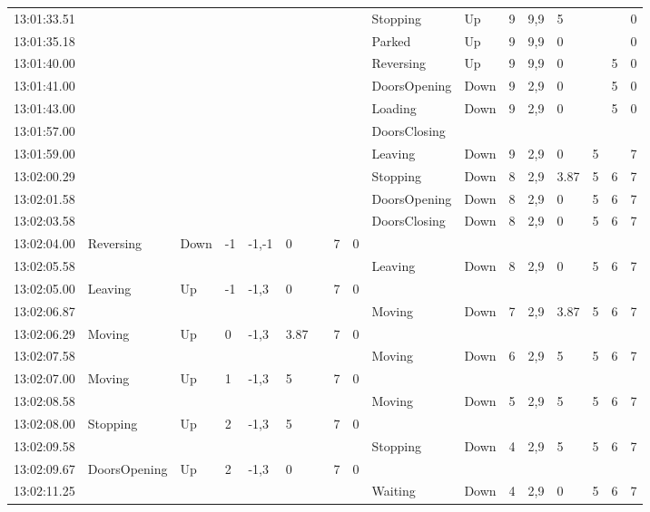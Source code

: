 \documentclass{UoYCSproject}
\begin{document}
\begin{landscape}
\begin{longtable}{l || l | l | l | l | l | l | l | l || l | l | l | l | l | l | l | l}
	13:01:33.51 &  &  &  &  &  &  &  &  & Stopping & Up & 9 & 9,9 & 5 &  &  & 0 \\
	13:01:35.18 &  &  &  &  &  &  &  &  & Parked & Up & 9 & 9,9 & 0 &  &  & 0 \\
	13:01:40.00 &  &  &  &  &  &  &  &  & Reversing & Up & 9 & 9,9 & 0 &  & 5 & 0 \\
	13:01:41.00 &  &  &  &  &  &  &  &  & DoorsOpening & Down & 9 & 2,9 & 0 &  & 5 & 0 \\
	13:01:43.00 &  &  &  &  &  &  &  &  & Loading & Down & 9 & 2,9 & 0 &  & 5 & 0 \\
	13:01:57.00 &  &  &  &  &  &  &  &  & DoorsClosing &  &  &  &  &  &  &  \\
	13:01:59.00 &  &  &  &  &  &  &  &  & Leaving & Down & 9 & 2,9 & 0 & 5 &  & 7 \\
	13:02:00.29 &  &  &  &  &  &  &  &  & Stopping & Down & 8 & 2,9 & 3.87 & 5 & 6 & 7 \\
	13:02:01.58 &  &  &  &  &  &  &  &  & DoorsOpening & Down & 8 & 2,9 & 0 & 5 & 6 & 7 \\
	13:02:03.58 &  &  &  &  &  &  &  &  & DoorsClosing & Down & 8 & 2,9 & 0 & 5 & 6 & 7 \\
	13:02:04.00 & Reversing & Down & -1 & -1,-1 & 0 &  & 7 & 0 &  &  &  &  &  &  &  &  \\
	13:02:05.58 &  &  &  &  &  &  &  &  & Leaving & Down & 8 & 2,9 & 0 & 5 & 6 & 7 \\
	13:02:05.00 & Leaving & Up & -1 & -1,3 & 0 &  & 7 & 0 &  &  &  &  &  &  &  &  \\
	13:02:06.87 &  &  &  &  &  &  &  &  & Moving & Down & 7 & 2,9 & 3.87 & 5 & 6 & 7 \\
	13:02:06.29 & Moving & Up & 0 & -1,3 & 3.87 &  & 7 & 0 &  &  &  &  &  &  &  &  \\
	13:02:07.58 &  &  &  &  &  &  &  &  & Moving & Down & 6 & 2,9 & 5 & 5 & 6 & 7 \\
	13:02:07.00 & Moving & Up & 1 & -1,3 & 5 &  & 7 & 0 &  &  &  &  &  &  &  &  \\
	13:02:08.58 &  &  &  &  &  &  &  &  & Moving & Down & 5 & 2,9 & 5 & 5 & 6 & 7 \\
	13:02:08.00 & Stopping & Up & 2 & -1,3 & 5 &  & 7 & 0 &  &  &  &  &  &  &  &  \\
	13:02:09.58 &  &  &  &  &  &  &  &  & Stopping & Down & 4 & 2,9 & 5 & 5 & 6 & 7 \\
	13:02:09.67 & DoorsOpening & Up & 2 & -1,3 & 0 &  & 7 & 0 &  &  &  &  &  &  &  &  \\
	13:02:11.25 &  &  &  &  &  &  &  &  & Waiting & Down & 4 & 2,9 & 0 & 5 & 6 & 7 \\

\end{longtable}
\end{landscape}
\end{document}
